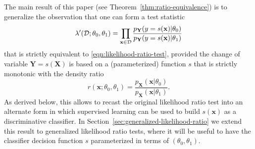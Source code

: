 \documentclass[12pt]{article}
\numberwithin{equation}{section}
\theoremstyle{plain}
\begin{document}
%

The main result of this paper (see Theorem~\ref{thm:ratio-equivalence}) is to
generalize the observation that one can form a test statistic
\begin{equation}\label{eqn:likelihood-ratio-test-equiv}
\lambda'({\cal D}; \theta_0, \theta_1) = \prod_{\mathbf{x} \in {\cal D}} \frac{ p_\mathbf{Y}(y=s(\mathbf{x}) | \theta_0)}{ p_\mathbf{Y}(y=s(\mathbf{x}) | \theta_1)}
\end{equation}
that is strictly equivalent to \ref{eqn:likelihood-ratio-test}, provided the change
of variable $\mathbf{Y} = s(\mathbf{X})$ is based
on a (parameterized) function $s$ that is strictly monotonic with the density ratio
\begin{equation}
r(\mathbf{x};\theta_0, \theta_1) = \frac{p_\mathbf{X}(\mathbf{x}|\theta_0)}{p_\mathbf{X}(\mathbf{x}|\theta_1)}.
\end{equation}
As derived below, this allows to recast the original likelihood ratio test into
an alternate form in which supervised learning can be used to build
$s(\mathbf{x})$ as a discriminative classifier.  In
Section~\ref{sec:generalized-likelihood-ratio} we extend this result to
generalized likelihood ratio tests, where it will be useful to have the
classifier decision function $s$ parameterized in terms of $(\theta_0, \theta_1)$.
\end{document}
